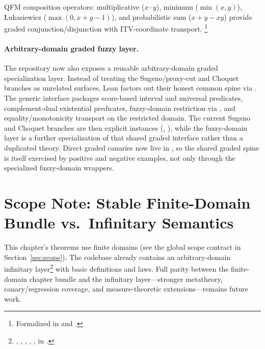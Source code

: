 \documentclass[11pt,openany]{report}
\begin{document}
QFM composition operators: multiplicative ($x \cdot y$), minimum
($\min(x,y)$), {\L}ukasiewicz ($\max(0, x+y-1)$), and probabilistic sum
($x + y - xy$) provide graded conjunction/disjunction with ITV-coordinate
transport.%
\footnote{Formalized in 
  and .}

\paragraph{Arbitrary-domain graded fuzzy layer.}
The repository now also exposes a reusable arbitrary-domain graded
specialization layer.  Instead of treating the Sugeno/proxy-cut and
Choquet branches as unrelated surfaces, Lean factors out their honest
common spine via
.
The generic interface  packages
score-based interval and universal predicates, complement-dual existential
predicates, fuzzy-domain restriction via , and
equality/monotonicity transport on the restricted domain.
The current Sugeno and Choquet branches are then explicit instances
(,
), while the fuzzy-domain layer is a
further specialization of that shared graded interface rather than a
duplicated theory.  Direct graded canaries now live in
, so the
shared graded spine is itself exercised by positive and negative examples,
not only through the specialized fuzzy-domain wrappers.

\section{Scope Note: Stable Finite-Domain Bundle vs.\ Infinitary Semantics}

This chapter's theorems use finite domains (see the global scope contract
in Section~\ref{sec:scope}).  The codebase already contains an
arbitrary-domain infinitary layer\footnote{%
  , ,
  , ,
  , 
  in .}
with basic definitions and laws.  Full parity between the finite-domain
chapter bundle and the infinitary layer---stronger metatheory,
canary/regression coverage, and measure-theoretic extensions---remains
future work.
\end{document}
